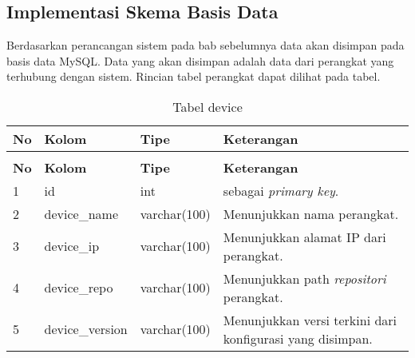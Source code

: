    	
    	
   	\subsection{Implementasi Skema Basis Data}
   	Berdasarkan perancangan sistem pada bab sebelumnya data akan disimpan pada basis data MySQL. Data yang akan disimpan adalah data dari perangkat yang terhubung dengan sistem. Rincian tabel perangkat dapat dilihat pada tabel.
   	\begin{longtable}{|p{}|p{}|p{}|p{}|}
   		
   		\caption{Tabel device} \label{tabeldevice} \\
   		\hline
   		\textbf{No} & \textbf{Kolom} & \textbf{Tipe} & \textbf{Keterangan} \\ \hline
   		\endfirsthead
   		\caption[]{Tabel device}   \\
   		\hline
   		\textbf{No} & \textbf{Kolom} & \textbf{Tipe} & \textbf{Keterangan} \\ \hline
   		\endhead
   		\endfoot
   		\endlastfoot
   		
   		1 & id & int & sebagai \textit{primary key}. \\ \hline
   		2 & device\_name & varchar(100) & Menunjukkan nama perangkat. \\ \hline
   		3 & device\_ip & varchar(100) & Menunjukkan alamat IP dari perangkat.\\ \hline	
   		4 & device\_repo & varchar(100) & Menunjukkan path \textit{repositori} perangkat.\\ \hline
   		5 & device\_version & varchar(100) & Menunjukkan versi terkini dari konfigurasi yang disimpan. \\ \hline
   		
   	\end{longtable}
   		